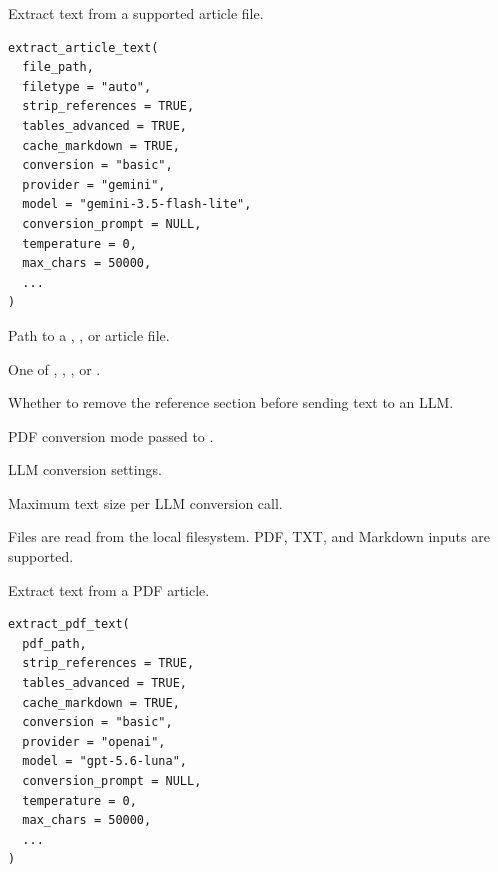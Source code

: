 \documentclass[a4paper]{book}
\begin{document}
%
\begin{Description}
Extract text from a supported article file.
\end{Description}
%
\begin{Usage}
\begin{verbatim}
extract_article_text(
  file_path,
  filetype = "auto",
  strip_references = TRUE,
  tables_advanced = TRUE,
  cache_markdown = TRUE,
  conversion = "basic",
  provider = "gemini",
  model = "gemini-3.5-flash-lite",
  conversion_prompt = NULL,
  temperature = 0,
  max_chars = 50000,
  ...
)
\end{verbatim}
\end{Usage}
%
\begin{Arguments}
\begin{ldescription}
\item[\code{file\_path}] Path to a , , or  article file.

\item[\code{filetype}] One of , , , or .

\item[\code{strip\_references}] Whether to remove the reference section before sending text to an LLM.

\item[\code{conversion}] PDF conversion mode passed to .

\item[\code{provider, model, conversion\_prompt, temperature}] LLM conversion settings.

\item[\code{max\_chars}] Maximum text size per LLM conversion call.
\end{ldescription}
\end{Arguments}
%
\begin{Details}
Files are read from the local filesystem. PDF, TXT, and Markdown
inputs are supported.
\end{Details}
%
\begin{Description}
Extract text from a PDF article.
\end{Description}
%
\begin{Usage}
\begin{verbatim}
extract_pdf_text(
  pdf_path,
  strip_references = TRUE,
  tables_advanced = TRUE,
  cache_markdown = TRUE,
  conversion = "basic",
  provider = "openai",
  model = "gpt-5.6-luna",
  conversion_prompt = NULL,
  temperature = 0,
  max_chars = 50000,
  ...
)
\end{verbatim}
\end{Usage}
\end{document}
